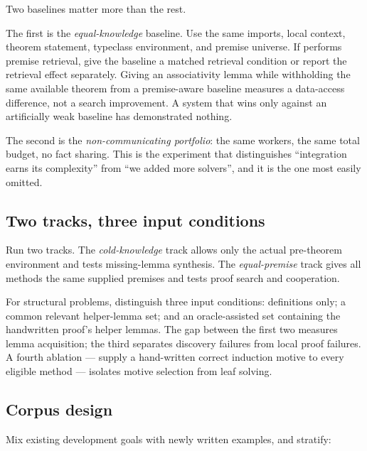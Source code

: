 Two baselines matter more than the rest.

The first is the \emph{equal-knowledge} baseline. Use the same imports, local
context, theorem statement, typeclass environment, and premise universe. If
\forge{} performs premise retrieval, give the baseline a matched retrieval
condition or report the retrieval effect separately. Giving \forge{} an
associativity lemma while withholding the same available theorem from a
premise-aware baseline measures a data-access difference, not a search
improvement. A system that wins only against an artificially weak baseline has
demonstrated nothing.

The second is the \emph{non-communicating portfolio}: the same workers, the same
total budget, no fact sharing. This is the experiment that distinguishes
``integration earns its complexity'' from ``we added more solvers'', and it is
the one most easily omitted.

\subsection{Two tracks, three input conditions}

Run two tracks. The \emph{cold-knowledge} track allows only the actual
pre-theorem environment and tests missing-lemma synthesis. The
\emph{equal-premise} track gives all methods the same supplied premises and
tests proof search and cooperation.

For structural problems, distinguish three input conditions: definitions only;
a common relevant helper-lemma set; and an oracle-assisted set containing the
handwritten proof's helper lemmas. The gap between the first two measures lemma
acquisition; the third separates discovery failures from local proof failures.
A fourth ablation --- supply a hand-written correct induction motive to every
eligible method --- isolates motive selection from leaf solving.

\subsection{Corpus design}

Mix existing development goals with newly written examples, and stratify:

